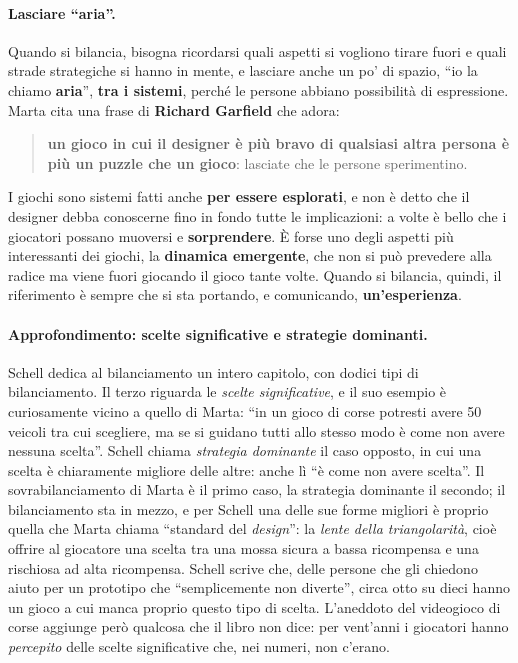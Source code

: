 \paragraph{Lasciare ``aria''.} Quando si bilancia, bisogna ricordarsi quali aspetti si vogliono
tirare fuori e quali strade strategiche si hanno in mente, e lasciare anche un po' di
spazio, ``io la chiamo \textbf{aria}'', \textbf{tra i sistemi}, perché le persone abbiano
possibilità di espressione. Marta cita una frase di \textbf{Richard Garfield} che adora:
\begin{quote}
\textbf{un gioco in cui il designer è più bravo di qualsiasi altra persona è più un puzzle
che un gioco}: lasciate che le persone sperimentino.
\end{quote}
I giochi sono sistemi fatti anche \textbf{per essere esplorati}, e non è detto che il
designer debba conoscerne fino in fondo tutte le implicazioni: a volte è bello che i
giocatori possano muoversi e \textbf{sorprendere}. È forse uno degli aspetti più interessanti
dei giochi, la \textbf{dinamica emergente}, che non si può prevedere alla radice ma viene fuori
giocando il gioco tante volte. Quando si bilancia, quindi, il riferimento è sempre che si sta
portando, e comunicando, \textbf{un'esperienza}.

\paragraph{Approfondimento: scelte significative e strategie dominanti.} Schell dedica al
bilanciamento un intero capitolo, con dodici tipi di bilanciamento. Il terzo riguarda le
\emph{scelte significative}, e il suo esempio è curiosamente vicino a quello di Marta: ``in un
gioco di corse potresti avere 50 veicoli tra cui scegliere, ma se si guidano tutti allo stesso
modo è come non avere nessuna scelta''. Schell chiama \emph{strategia dominante} il caso
opposto, in cui una scelta è chiaramente migliore delle altre: anche lì ``è come non avere
scelta''. Il sovrabilanciamento di Marta è il primo caso, la strategia dominante il secondo; il
bilanciamento sta in mezzo, e per Schell una delle sue forme migliori è proprio quella che Marta
chiama ``standard del \emph{design}'': la \emph{lente della triangolarità}, cioè offrire al
giocatore una scelta tra una mossa sicura a bassa ricompensa e una rischiosa ad alta ricompensa.
Schell scrive che, delle persone che gli chiedono aiuto per un prototipo che ``semplicemente
non diverte'', circa otto su dieci hanno un gioco a cui manca proprio questo tipo di scelta.
L'aneddoto del videogioco di corse aggiunge però qualcosa che il libro non dice: per vent'anni i
giocatori hanno \emph{percepito} delle scelte significative che, nei numeri, non c'erano.

